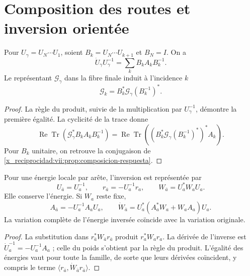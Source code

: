 \section{Composition des routes et inversion orientée}

\begin{proposition}
\label{x_reciprocidad:vii:prop:pullback-invertible}
Pour \(U_\gamma=U_N\cdots U_1\), soient
\(B_k=U_N\cdots U_{k+1}\) et \(B_N=I\). On a
\[
 \dot U_\gamma U_\gamma^{-1}
   =\sum_kB_kA_kB_k^{-1}.
\]
Le représentant \(\mathcal G_\gamma\) dans la fibre finale induit
à l'incidence \(k\)
\begin{equation}
 \mathcal G_k=B_k^*\mathcal G_\gamma(B_k^{-1})^*.
 \label{x_reciprocidad:vii:eq:transporte-contragrediente}
\end{equation}
\end{proposition}

\begin{proof}
La règle du produit, suivie de la multiplication par
\(U_\gamma^{-1}\), démontre la première égalité. La cyclicité
de la trace donne
\[
 \operatorname{Re}\operatorname{Tr}
  (\mathcal G_\gamma^*B_kA_kB_k^{-1})
 =\operatorname{Re}\operatorname{Tr}
  ((B_k^*\mathcal G_\gamma(B_k^{-1})^*)^*A_k).
\]
Pour \(B_k\) unitaire, on retrouve la conjugaison de
\ref{x_reciprocidad:vii:prop:composicion-respuesta}.
\end{proof}

\begin{proposition}
\label{x_reciprocidad:vii:prop:inversion-congruencia}
Pour une énergie locale par arête, l'inversion est représentée par
\begin{equation}
 U_{\bar a}=U_a^{-1},\qquad
 r_{\bar a}=-U_a^{-1}r_a,\qquad
 W_{\bar a}=U_a^*W_aU_a.
 \label{x_reciprocidad:vii:eq:inversion-peso-general}
\end{equation}
Elle conserve l'énergie. Si \(W_a\) reste fixe,
\[
 A_{\bar a}=-U_a^{-1}A_aU_a,\qquad
 \dot W_{\bar a}=U_a^*(A_a^*W_a+W_aA_a)U_a.
\]
La variation complète de l'énergie inversée coïncide avec la variation originale.
\end{proposition}

\begin{proof}
La substitution dans \(r_{\bar a}^*W_{\bar a}r_{\bar a}\) produit \(r_a^*W_ar_a\). La dérivée de l'inverse est \(\dot U_a^{-1}=-U_a^{-1}A_a\) ; celle du poids s'obtient par la règle du produit. L'égalité des énergies vaut pour toute la famille, de sorte que leurs dérivées coïncident, y compris le terme \(\langle r_{\bar a},\dot W_{\bar a}r_{\bar a}\rangle\).
\end{proof}

